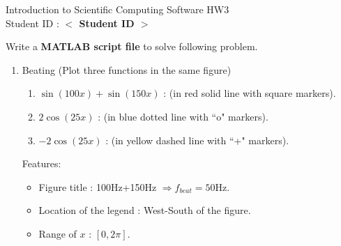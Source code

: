 \documentclass[12pt,a4paper]{article}
\newcommand{\placeholder}[1]{\textbf{$<$ #1 $>$}}
\newcommand{\idnumber}{\placeholder{Student ID}}
\begin{document}
\begin{flushleft}Introduction to Scientific Computing Software HW3
\\Student ID : \idnumber{}\end{flushleft}

Write a \textbf{MATLAB script file} to solve following problem.
\begin{enumerate}
\item Beating (Plot three functions in the same figure)
\begin{enumerate} 
\item $\sin(100x)+\sin(150x)$ : (in red solid line with square markers).

\item $2\cos(25x)$ : (in blue dotted line with ``o" markers).
\item $-2\cos(25x)$ : (in yellow dashed line with ``+" markers).
\end{enumerate}
Features:
\begin{itemize}
\item Figure title : 100Hz+150Hz $\Rightarrow f_{beat}=50$Hz.
\item Location of the legend : West-South of the figure.
\item Range of $x $ : $[0,2\pi]$.
\end{itemize}
\end{enumerate}
\end{document}
